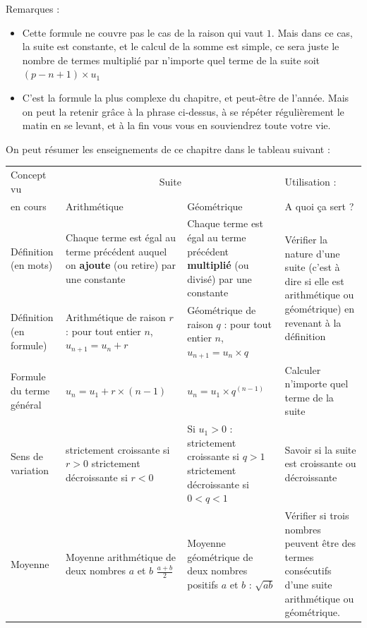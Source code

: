 \documentclass[10pt,a4paper]{book}
\begin{document}
Remarques : \begin{itemize}
    \item Cette formule ne couvre pas le cas de la raison qui vaut $1$. Mais dans ce cas, la suite est constante, et le calcul de la somme est simple, ce sera juste le nombre de termes multiplié par n'importe quel terme de la suite soit $(p-n+1) \times u_1$
    \item C'est la formule la plus complexe du chapitre, et peut-être de l'année. Mais on peut la retenir grâce à la phrase ci-dessus, à se répéter régulièrement le matin en se levant, et à la fin vous vous en souviendrez toute votre vie.
\end{itemize} 


On peut résumer les enseignements de ce chapitre dans le tableau suivant :

\begin{tabular}{|p{}|p{}|p{}|p{}|}
    \hline
    Concept vu & \multicolumn{2}{c|}{Suite} & Utilisation :\\
    en cours& Arithmétique & Géométrique & A quoi ça sert ?\\
    \hline
     Définition (en mots)& Chaque terme est égal au terme précédent auquel on \textbf{ajoute} (ou retire) par une constante & Chaque terme est égal au terme précédent \textbf{multiplié} (ou divisé) par une constante & \multirow{2}{0.2\textwidth}{Vérifier la nature d'une suite (c'est à dire si elle est arithmétique ou géométrique) en revenant à la définition}\\
    \cline{1-3}
     Définition (en formule) & Arithmétique de raison $r$ : pour tout entier $n$, \newline$u_{n+1}=u_n+r$& Géométrique de raison $q$ : pour tout entier $n$, \newline $u_{n+1}=u_n \times q$ \newline ~& \\
     \hline
     Formule du terme général & $u_n = u_1 + r \times (n-1)$ & $u_n=u_1 \times q^{(n-1)}$ & Calculer n'importe quel terme de la suite\\
     \hline
     Sens de variation & strictement croissante si $r>0$ \newline strictement décroissante si $r<0$ & Si $u_1>0$ : strictement croissante si $q>1$ \newline strictement décroissante si $0<q<1$ & Savoir si la suite est croissante ou décroissante\\
     \hline
     Moyenne & Moyenne arithmétique de deux nombres $a$ et $b$ \newline $\frac{a+b}{2}$ & Moyenne géométrique de deux nombres positifs $a$ et $b$ : $\sqrt{ab}$ & Vérifier si trois nombres peuvent être des termes consécutifs d'une suite arithmétique ou géométrique.\\

\end{tabular}
\end{document}
